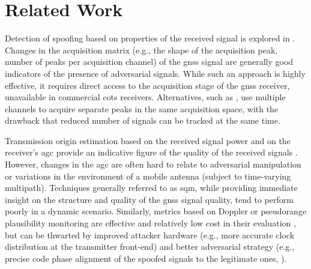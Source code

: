 \section{Related Work}
\label{sec:related_work}
Detection of spoofing based on properties of the received signal is explored in \cite{WOS:000359380700146,WOS:000209006500003,WOS:000423143700015}. Changes in the acquisition matrix (e.g., the shape of the acquisition peak, number of peaks per acquisition channel) of the \gls{gnss} signal are generally good indicators of the presence of adversarial signals. While such an approach is highly effective, it requires direct access to the acquisition stage of the \gls{gnss} receiver, unavailable in commercial \gls{cots} receivers. Alternatives, such as \cite{DBLP:conf/ndss/SathayeLCR22}, use multiple channels to acquire separate peaks in the same acquisition space, with the drawback that reduced number of signals can be tracked at the same time. 

Transmission origin estimation based on the received signal power and on the receiver's \gls{agc} provide an indicative figure of the quality of the received signals \cite{WOS:000423143700015,akos2003,WOS:000209006500003}. However, changes in the \gls{agc} are often hard to relate to adversarial manipulation or variations in the environment of a mobile antenna (subject to time-varying multipath). Techniques generally referred to as \gls{sqm}, while providing immediate insight on the structure and quality of the \gls{gnss} signal quality, tend to perform poorly in a dynamic scenario. Similarly, metrics based on Doppler or pseudorange plausibility monitoring are effective and relatively low cost in their evaluation \cite{PapadimitratosJa:C:2008}, but can be thwarted by improved attacker hardware (e.g., more accurate clock distribution at the transmitter front-end) and better adversarial strategy (e.g., precise code phase alignment of the spoofed signals to the legitimate ones, \cite{SpangheroPP:C:2023}). 

